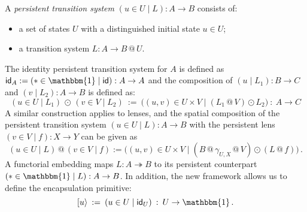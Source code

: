 \documentclass[acmsmall,screen,review,anonymous]{acmart}
\newcommand{\kw}[1]{\ensuremath{ \mathsf{#1} }}
\renewcommand{\preceq}{\le}
\newcommand{\intl}[1]{#1^0}
\begin{document}
\begin{definition} \label{def:slts} %
A \emph{persistent transition system}
$(u \in U \mid L) : A \rightarrow B$
consists of:
\begin{itemize}
  \item a set of states $U$ with a distinguished initial state $u \in U$;
  \item a transition system $L : A \rightarrow B \mathbin@ U$.
\end{itemize}
The identity persistent transition system for $A$ is defined as
$\kw{id}_A := (* \in \mathbbm{1} \mid \kw{id}) : A \rightarrow A$
and the composition of
$(u \mid L_1) : B \rightarrow C$ and
$(v \mid L_2) : A \rightarrow B$ is defined as:
\[
  (u \in U \mid L_1) \,\odot\, (v \in V \mid L_2) \::=\:
  \big( (u, v) \in U \times V \mid
        (L_1 \mathbin@ V) \odot L_2 \big)
  \::\: A \rightarrow C
\]
A similar construction applies to lenses,
and the spatial composition of the persistent transition system
$(u \in U \mid L) : A \rightarrow B$
with the persistent lens
$(v \in V \mid f) : X \rightarrow Y$
can be given as
\[
  (u \in U \mid L) \mathbin@ (v \in V \mid f) :=
  \big( (u, v) \in U \times V \mid
    (B \mathbin@ \gamma_{U,X} \mathbin@ V) \odot
    (L \mathbin@ f) \big)
  \,.
\]
A functorial embedding
maps $L : A \twoheadrightarrow B$
to its persistent counterpart $(* \in \mathbbm{1} \mid L) : A \rightarrow B$.
In addition,
the new framework allows us to define the encapsulation primitive:
\[
  [ u \rangle \: := \:  (u \in U \mid \kw{id}_U)
  \: : \: U \rightarrow \mathbbm{1}
  \,.
\]
\end{definition}


%
\end{document}
